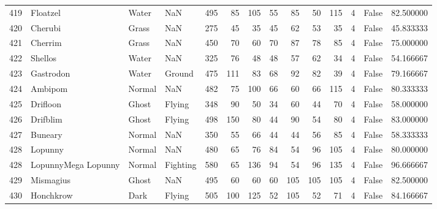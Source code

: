 \begin{tabular}{rlllrrrrrrrrlr}
 419 &                   Floatzel &     Water &       NaN &    495 &   85 &     105 &       55 &       85 &       50 &    115 &           4 &      False &   82.500000 \\
 420 &                    Cherubi &     Grass &       NaN &    275 &   45 &      35 &       45 &       62 &       53 &     35 &           4 &      False &   45.833333 \\
 421 &                    Cherrim &     Grass &       NaN &    450 &   70 &      60 &       70 &       87 &       78 &     85 &           4 &      False &   75.000000 \\
 422 &                    Shellos &     Water &       NaN &    325 &   76 &      48 &       48 &       57 &       62 &     34 &           4 &      False &   54.166667 \\
 423 &                  Gastrodon &     Water &    Ground &    475 &  111 &      83 &       68 &       92 &       82 &     39 &           4 &      False &   79.166667 \\
 424 &                    Ambipom &    Normal &       NaN &    482 &   75 &     100 &       66 &       60 &       66 &    115 &           4 &      False &   80.333333 \\
 425 &                   Drifloon &     Ghost &    Flying &    348 &   90 &      50 &       34 &       60 &       44 &     70 &           4 &      False &   58.000000 \\
 426 &                   Drifblim &     Ghost &    Flying &    498 &  150 &      80 &       44 &       90 &       54 &     80 &           4 &      False &   83.000000 \\
 427 &                    Buneary &    Normal &       NaN &    350 &   55 &      66 &       44 &       44 &       56 &     85 &           4 &      False &   58.333333 \\
 428 &                    Lopunny &    Normal &       NaN &    480 &   65 &      76 &       84 &       54 &       96 &    105 &           4 &      False &   80.000000 \\
 428 &        LopunnyMega Lopunny &    Normal &  Fighting &    580 &   65 &     136 &       94 &       54 &       96 &    135 &           4 &      False &   96.666667 \\
 429 &                  Mismagius &     Ghost &       NaN &    495 &   60 &      60 &       60 &      105 &      105 &    105 &           4 &      False &   82.500000 \\
 430 &                  Honchkrow &      Dark &    Flying &    505 &  100 &     125 &       52 &      105 &       52 &     71 &           4 &      False &   84.166667 \\

\end{tabular}
